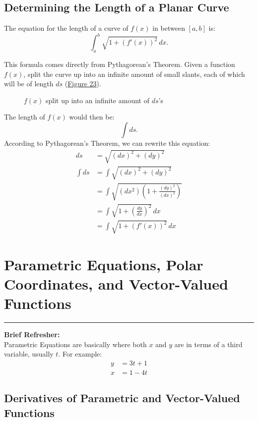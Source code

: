 \documentclass[12pt]{article}
\newcommand{\fline}{\par\noindent\rule{\textwidth}{0.1pt}} %
\begin{document}
\subsection{Determining the Length of a Planar Curve}
The equation for the length of a curve of $f(x)$ in between $[a, b]$ is:
\[ \int_a^b \sqrt{1 + \left( f'(x) \right)^2} \, dx.\]

This formula comes directly from Pythagorean's Theorem. Given a function $f(x)$, split the curve up into an infinite amount of small slants, each of which will be of length $ds$ (\hyperref[fig:planarcurve]{Figure 23}).

\begin{figure}[H]
    \begin{center}
        \caption{$f(x)$ split up into an infinite amount of $ds$'s}
        \label{fig:planarcurve}
    \end{center}
\end{figure}

\noindent The length of $f(x)$ would then be:
\[ \int ds. \]
According to Pythagorean's Theorem, we can rewrite this equation:
\begin{align*}
    ds      & = \sqrt{(dx)^2 + (dy)^2}                                      \\
    \int ds & = \int \sqrt{(dx)^2 + (dy)^2}                                 \\
            & = \int \sqrt{(dx^2) \left( 1 + \frac{(dy)^2}{(dx)^2} \right)} \\[6pt]
            & = \int \sqrt{1 + \left(\frac{dy}{dx} \right)^2} \, dx         \\[6pt]
            & = \int \sqrt{1 + \left( f'(x) \right)^2} \, dx
\end{align*}

\section{Parametric Equations, Polar Coordinates, and Vector-Valued Functions}
\fline

\noindent \textbf{Brief Refresher:}
\\ Parametric Equations are basically where both $x$ and $y$ are in terms of a third variable, usually $t$. For example:
\begin{align*}
    y & = 3t + 1 \\
    x & = 1 - 4t
\end{align*}

\subsection{Derivatives of Parametric and Vector-Valued Functions}
\end{document}
